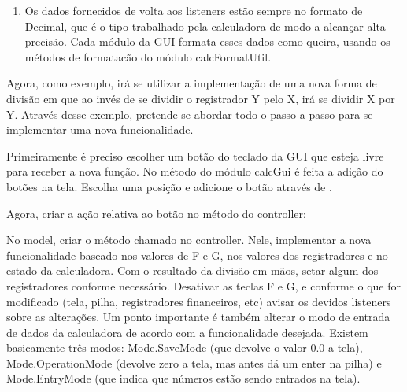 \begin{enumerate}
\item Os dados fornecidos de volta aos listeners estão sempre no formato de Decimal, que é o tipo trabalhado pela 
calculadora de modo a alcançar alta precisão. Cada módulo da GUI formata esses dados como queira, usando os métodos 
de formatacão do módulo calcFormatUtil.

\end{enumerate}

Agora, como exemplo, irá se utilizar a implementação de uma nova forma de divisão em que ao invés de se dividir o 
registrador Y pelo X, irá se dividir X por Y. Através desse exemplo, pretende-se abordar todo o passo-a-passo para se 
implementar uma nova funcionalidade.

Primeiramente é preciso escolher um botão do teclado da GUI que esteja livre para receber a nova função. 
No método %
 do módulo calcGui é feita a adição do botões na tela. Escolha uma posição e adicione o 
botão através de %
.

Agora, criar a ação relativa ao botão no método %
do controller: 

No model, criar o método chamado no controller. Nele, implementar a nova funcionalidade baseado nos valores de 
F e G, nos valores dos registradores e no estado da calculadora. Com o resultado da divisão em mãos, setar algum dos 
registradores conforme necessário. Desativar as teclas F e G, e conforme o que for modificado (tela, pilha, registradores 
financeiros, etc) avisar os devidos listeners sobre as alterações. Um ponto importante é também alterar o modo de 
entrada de dados da calculadora de acordo com a funcionalidade desejada. Existem basicamente três modos: 
Mode.SaveMode (que devolve o valor 0.0 a tela), Mode.OperationMode (devolve zero a tela, mas antes dá um enter na pilha) 
e Mode.EntryMode (que indica que números estão sendo entrados na tela).
%         
%         
%                  
